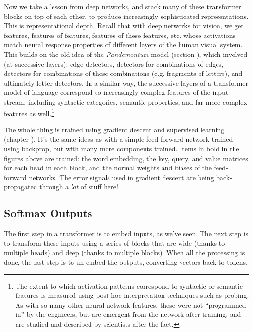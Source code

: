Now we take a lesson from deep networks, and stack many of these transformer blocks on top of each other, to produce increasingly sophisticated representations. This is representational depth. Recall that with deep networks for vision, we get features, features of features, features of these features, etc. whose activations match neural response properties of different layers of the human visual system. This builds on the old idea of the \emph{Pandemonium} model (section ), which involved (at successive layers): edge detectors, detectors for combinations of edges, detectors for combinations of these combinations (e.g. fragments of letters), and ultimately letter detectors. In a similar way, the successive layers of a transformer model of language correspond to increasingly complex features of the input stream, including syntactic categories, semantic properties, and far more complex features as well.\footnote{The extent to which activation patterns correspond to syntactic or semantic features is measured using post-hoc interpretation techniques such as probing. As with so many other neural network features, these were not ``programmed in'' by the engineers, but are emergent from the network after training, and are studied and described by scientists after the fact.}

The whole thing is trained using gradient descent and supervised learning (chapter ). It's the same ideas as with a simple feed-forward network trained using backprop, but with many more components trained. Items in bold in the figures above are trained: the word embedding, the key, query, and value matrices for each head in each block, and the normal weights and biases of the feed-forward networks. The error signals used in gradient descent are being back-propagated through a \emph{lot} of stuff here!

\subsection{Softmax Outputs}\label{llmOutput}

The first step in a transformer is to embed inputs, as we've seen. The next step is to transform these inputs using a series of blocks that are wide (thanks to multiple heads) and deep (thanks to multiple blocks). When all the processing is done, the last step is to un-embed the outputs, converting vectors back to tokens. 


